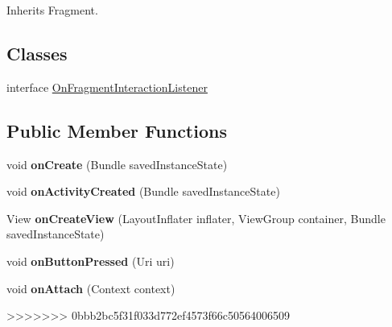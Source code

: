 \begin{DoxyCompactItemize}
\-Inherits \-Fragment.

\subsection*{\-Classes}
\begin{DoxyCompactItemize}
\item 
interface \hyperlink{interfacecom_1_1example_1_1sel_1_1lostfound_1_1FeedFragment_1_1OnFragmentInteractionListener}{\-On\-Fragment\-Interaction\-Listener}
\end{DoxyCompactItemize}
\subsection*{\-Public \-Member \-Functions}
\begin{DoxyCompactItemize}
\item 
\hypertarget{classcom_1_1example_1_1sel_1_1lostfound_1_1FeedFragment_a027942ee12844b17c604195b91f9948d}{void {\bfseries on\-Create} (\-Bundle saved\-Instance\-State)}\label{classcom_1_1example_1_1sel_1_1lostfound_1_1FeedFragment_a027942ee12844b17c604195b91f9948d}

\item 
\hypertarget{classcom_1_1example_1_1sel_1_1lostfound_1_1FeedFragment_abb8194bc01339ece4f650c3b7e716a5f}{void {\bfseries on\-Activity\-Created} (\-Bundle saved\-Instance\-State)}\label{classcom_1_1example_1_1sel_1_1lostfound_1_1FeedFragment_abb8194bc01339ece4f650c3b7e716a5f}

\item 
\hypertarget{classcom_1_1example_1_1sel_1_1lostfound_1_1FeedFragment_a4e2cc79785d7392af2839c0b3900b12b}{\-View {\bfseries on\-Create\-View} (\-Layout\-Inflater inflater, \-View\-Group container, \-Bundle saved\-Instance\-State)}\label{classcom_1_1example_1_1sel_1_1lostfound_1_1FeedFragment_a4e2cc79785d7392af2839c0b3900b12b}

\item 
\hypertarget{classcom_1_1example_1_1sel_1_1lostfound_1_1FeedFragment_a4a39372816f2c53d6ff1b3d12be98c23}{void {\bfseries on\-Button\-Pressed} (\-Uri uri)}\label{classcom_1_1example_1_1sel_1_1lostfound_1_1FeedFragment_a4a39372816f2c53d6ff1b3d12be98c23}

\item 
\hypertarget{classcom_1_1example_1_1sel_1_1lostfound_1_1FeedFragment_a63947b4cbebd081d42113ff157a2f6b0}{void {\bfseries on\-Attach} (\-Context context)}\label{classcom_1_1example_1_1sel_1_1lostfound_1_1FeedFragment_a63947b4cbebd081d42113ff157a2f6b0}
>>>>>>> 0bbb2bc5f31f033d772ef4573f66c50564006509


\end{DoxyCompactItemize}
\end{DoxyCompactItemize}
